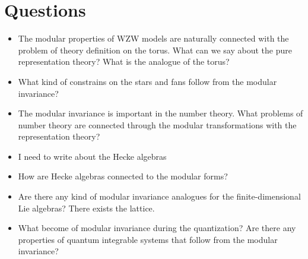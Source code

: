 \documentclass[a4paper,12pt]{article}
\theoremstyle{definition} \newtheorem{Def}{Definition}
\begin{document}
\section{Questions}
\label{sec:questions}
\begin{itemize}
\item The modular properties of WZW models are naturally connected with the problem of theory definition on the torus. What can we say about the pure representation theory? What is the analogue of the torus?
\item What kind of constrains on the stars and fans follow from the modular invariance?
\item The modular invariance is important in the number theory. What problems of number theory are connected through the modular transformations with the representation theory?
\item I need to write about the Hecke algebras
\item How are Hecke algebras connected to the modular forms?
\item Are there any kind of modular invariance analogues for the finite-dimensional Lie algebras? There exists the lattice.
\item What become of modular invariance during the quantization? Are there any properties of quantum integrable systems that follow from the modular invariance?
\end{itemize}

{}

\end{document}
